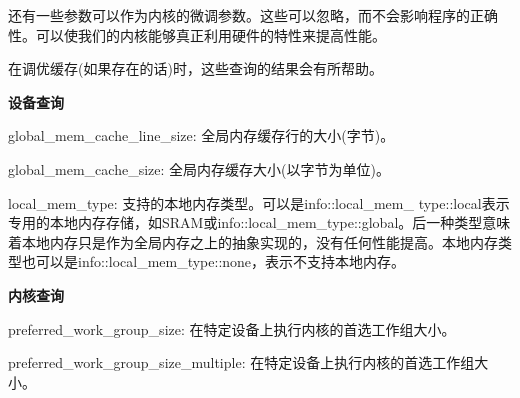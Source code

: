 还有一些参数可以作为内核的微调参数。这些可以忽略，而不会影响程序的正确性。可以使我们的内核能够真正利用硬件的特性来提高性能。\par

\begin{tcolorbox}[colback=red!5!white,colframe=red!75!black]
在调优缓存(如果存在的话)时，这些查询的结果会有所帮助。
\end{tcolorbox}

\hspace*{\fill} \par %
\textbf{设备查询}

global\_mem\_cache\_line\_size: 全局内存缓存行的大小(字节)。\par

global\_mem\_cache\_size: 全局内存缓存大小(以字节为单位)。\par

local\_mem\_type: 支持的本地内存类型。可以是info::local\_mem\_
type::local表示专用的本地内存存储，如SRAM或info::local\_mem\_type::global。后一种类型意味着本地内存只是作为全局内存之上的抽象实现的，没有任何性能提高。本地内存类型也可以是info::local\_mem\_type::none，表示不支持本地内存。\par

\hspace*{\fill} \par %
\textbf{内核查询}

preferred\_work\_group\_size: 在特定设备上执行内核的首选工作组大小。\par

preferred\_work\_group\_size\_multiple: 在特定设备上执行内核的首选工作组大小。\par
















































